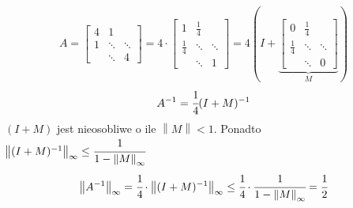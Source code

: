 \documentclass[hidelinks,a4paper,fleqn,oneside]{book}
\newcommand{\norm}[1]{\left\lVert#1\right\rVert}
\newtheorem{twierdz}{Twierdzenie}
\begin{document}
\[
	A = \left[
		\begin{array}{ccc}
		4 & 1 & \\
		1 & \ddots & \ddots \\
		& \ddots & 4
		\end{array}
	\right]
	 = 4 \cdot  \left[
		\begin{array}{ccc}
		1 & \frac{1}{4} & \\
		\frac{1}{4} & \ddots & \ddots \\
		& \ddots & 1
		\end{array}
	\right]
	= 4(I + \underbrace{\left[
		\begin{array}{ccc}
		0 & \frac{1}{4} & \\
		\frac{1}{4} & \ddots & \ddots \\
		& \ddots & 0
		\end{array}
	\right]}_{M})
\]
\[
	A^{-1} = \cfrac{1}{4} (I + M)^{-1}
\]
$(I + M)$ jest nieosobliwe o ile $\norm{M} < 1$. Ponadto $\norm{(I+M)^{-1}}_\infty \leq \cfrac{1}{1-\norm{M}_\infty}$
\[
	\norm{A^{-1}}_\infty = \cfrac{1}{4} \cdot \norm{(I+M)^{-1}}_\infty \leq \cfrac{1}{4} \cdot \cfrac{1}{1-\norm{M}_\infty} = \cfrac{1}{2}
\]


\printindex
\end{document}
